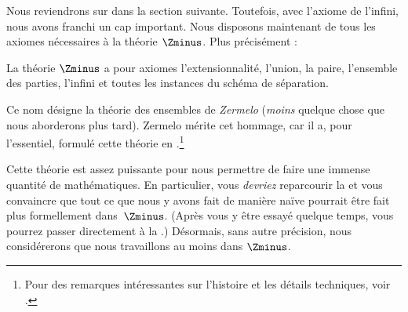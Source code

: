 \documentclass[../../../include/open-logic-section]{subfiles}
\begin{document}

Nous reviendrons sur \stagesinf{} dans la section suivante. Toutefois,
avec l'axiome de l'infini, nous avons franchi un cap important. Nous
disposons maintenant de tous les axiomes nécessaires à la théorie
$\Zminus$. Plus précisément :

\begin{defn}
La théorie $\Zminus$ a pour axiomes l'extensionnalité, l'union, la
paire, l'ensemble des parties, l'infini et toutes les instances du
schéma de séparation.
\end{defn}

Ce nom désigne la théorie des ensembles de \emph{Zermelo} (\emph{moins}
quelque chose que nous aborderons plus tard). Zermelo mérite cet hommage,
car il a, pour l'essentiel, formulé cette théorie en
\citeyear{Zermelo1908Untersuchungen}.\footnote{Pour des remarques
intéressantes sur l'histoire et les détails techniques, voir
\citet[annexe~A]{Potter2004}.}

Cette théorie est assez puissante pour nous permettre de faire une
immense quantité de mathématiques. En particulier, vous \emph{devriez}
reparcourir la  et vous convaincre que tout ce que
nous y avons fait de manière naïve pourrait être fait plus formellement
dans~$\Zminus$. (Après vous y être essayé quelque temps, vous pourrez
passer directement à la .)
Désormais, sans autre précision, nous considérerons que nous
travaillons au moins dans $\Zminus$.
\end{document}
